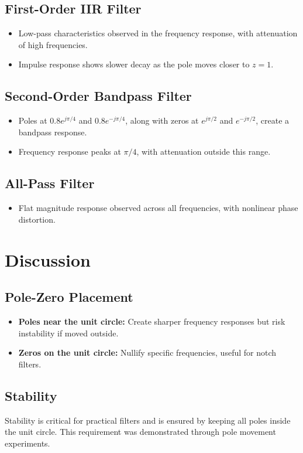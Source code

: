 \documentclass[12pt]{article}
\begin{document}
	\subsection*{First-Order IIR Filter}
	\begin{itemize}
		\item Low-pass characteristics observed in the frequency response, with attenuation of high frequencies.
		\item Impulse response shows slower decay as the pole moves closer to $z = 1$.
	\end{itemize}
	
	\subsection*{Second-Order Bandpass Filter}
	\begin{itemize}
		\item Poles at $0.8e^{j\pi/4}$ and $0.8e^{-j\pi/4}$, along with zeros at $e^{j\pi/2}$ and $e^{-j\pi/2}$, create a bandpass response.
		\item Frequency response peaks at $\pi/4$, with attenuation outside this range.
	\end{itemize}
	
	\subsection*{All-Pass Filter}
	\begin{itemize}
		\item Flat magnitude response observed across all frequencies, with nonlinear phase distortion.
	\end{itemize}
	
	\section*{Discussion}
	\subsection*{Pole-Zero Placement}
	\begin{itemize}
		\item \textbf{Poles near the unit circle:} Create sharper frequency responses but risk instability if moved outside.
		\item \textbf{Zeros on the unit circle:} Nullify specific frequencies, useful for notch filters.
	\end{itemize}
	
	\subsection*{Stability}
	Stability is critical for practical filters and is ensured by keeping all poles inside the unit circle. This requirement was demonstrated through pole movement experiments.
	
\end{document}
